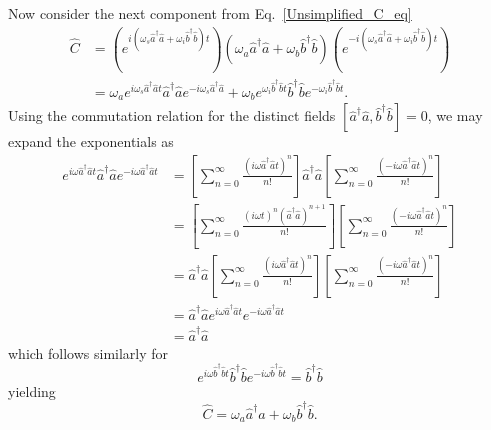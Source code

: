 \documentclass[aps,pra,showpacs,amsmath,amssymb,nofootinbib,longbibliography,superscriptaddress
]{revtex4-1}
\theoremstyle{definition}
\theoremstyle{remark}
\newcommand{\0}{\hat{0}}
\begin{document}
Now consider the next component from Eq.~\eqref{Unsimplified_C_eq}
\begin{align}
    \hat{C} &= \left(e^{i(\omega_s \hat{a}^{\dagger} \hat{a} + \omega_i \hat{b}^{\dagger} \hat{b})t}\right) \left(\omega_{a} \hat{a}^{\dagger}\hat{a} + \omega_{b} \hat{b}^{\dagger}\hat{b}\right)\left(e^{-i(\omega_s \hat{a}^{\dagger} \hat{a} + \omega_i \hat{b}^{\dagger} \hat{b})t}\right) \nonumber \\
    &= \omega_{a} e^{i\omega_s \hat{a}^{\dagger} \hat{a}t} \hat{a}^{\dagger}\hat{a} e^{-i\omega_s \hat{a}^{\dagger} \hat{a}} + \omega_{b} e^{\omega_i \hat{b}^{\dagger} \hat{b}t} \hat{b}^{\dagger}\hat{b} e^{-\omega_i \hat{b}^{\dagger} \hat{b}t}.
\end{align}
Using the commutation relation for the distinct fields $\left[ \hat{a}^{\dagger} \hat{a}, \hat{b}^{\dagger} \hat{b} \right] = 0$, we may expand the exponentials as
\begin{align}
    e^{i\omega \hat{a}^{\dagger} \hat{a} t} \hat{a}^{\dagger} \hat{a} e^{-i\omega \hat{a}^{\dagger} \hat{a} t}
    &= \left[\sum_{n=0}^{\infty} \frac{\left(i\omega \hat{a}^{\dagger} \hat{a} t\right)^n}{n!}\right] \hat{a}^{\dagger} \hat{a} \left[\sum_{n=0}^{\infty} \frac{\left(-i\omega \hat{a}^{\dagger} \hat{a} t\right)^n}{n!}\right] \nonumber \\
    &= \left[\sum_{n=0}^{\infty} \frac{\left(i \omega t\right)^n \left(\hat{a}^{\dagger} \hat{a}\right)^{n+1}}{n!}\right] \left[\sum_{n=0}^{\infty} \frac{\left(-i\omega \hat{a}^{\dagger} \hat{a} t\right)^n}{n!}\right] \nonumber \\
    &= \hat{a}^{\dagger} \hat{a} \left[\sum_{n=0}^{\infty} \frac{\left(i\omega \hat{a}^{\dagger} \hat{a} t\right)^n}{n!}\right] \left[\sum_{n=0}^{\infty} \frac{\left(-i\omega \hat{a}^{\dagger} \hat{a} t\right)^n}{n!}\right] \nonumber \\
    &= \hat{a}^{\dagger} \hat{a} e^{i\omega \hat{a}^{\dagger} \hat{a} t}  e^{-i\omega \hat{a}^{\dagger} \hat{a} t} \nonumber \\
    &= \hat{a}^{\dagger} \hat{a}
\end{align}
which follows similarly for
\begin{equation}
    e^{i\omega \hat{b}^{\dagger} \hat{b} t} \hat{b}^{\dagger} \hat{b} e^{-i\omega \hat{b}^{\dagger} \hat{b} t} = \hat{b}^{\dagger} \hat{b}
\end{equation}
yielding
\begin{equation}
    \hat{C} = \omega_{a} \hat{a}^{\dagger}\hat{a} + \omega_{b} \hat{b}^{\dagger}\hat{b}.
\end{equation}
\end{document}
